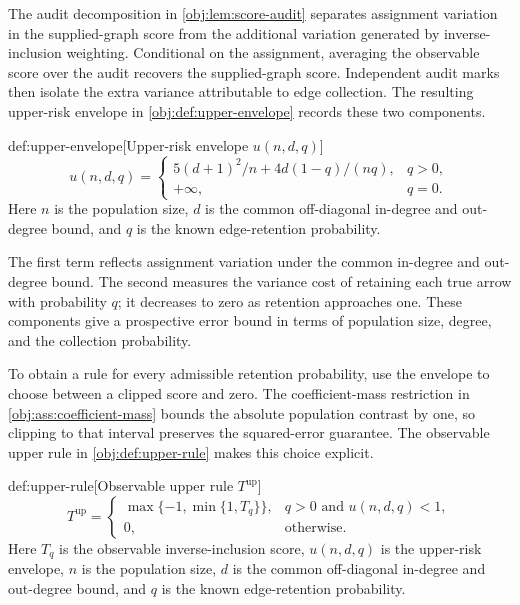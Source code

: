 The audit decomposition in \cref{obj:lem:score-audit} separates assignment variation in the supplied-graph score from the additional variation generated by inverse-inclusion weighting. Conditional on the assignment, averaging the observable score over the audit recovers the supplied-graph score. Independent audit marks then isolate the extra variance attributable to edge collection. The resulting upper-risk envelope  in \cref{obj:def:upper-envelope} records these two components.

\begin{definitionv}{def:upper-envelope}[Upper-risk envelope $u(n,d,q)$]
\[
u(n,d,q)
=
\begin{cases}
5(d+1)^2/n+4d(1-q)/(nq),&q>0,\\
+\infty,&q=0.
\end{cases}
\]
Here \(n\) is the population size, \(d\) is the common off-diagonal in-degree and out-degree bound, and \(q\) is the known edge-retention probability.
\end{definitionv}

The first term reflects assignment variation under the common in-degree and out-degree bound. The second measures the variance cost of retaining each true arrow with probability \(q\); it decreases to zero as retention approaches one. These components give a prospective error bound in terms of population size, degree, and the collection probability.

To obtain a rule for every admissible retention probability, use the envelope to choose between a clipped score and zero. The coefficient-mass restriction in \cref{obj:ass:coefficient-mass} bounds the absolute population contrast by one, so clipping to that interval preserves the squared-error guarantee. The observable upper rule  in \cref{obj:def:upper-rule} makes this choice explicit.

\begin{definitionv}{def:upper-rule}[Observable upper rule $T^{\mathrm{up}}$]
\[
T^{\mathrm{up}}
=
\begin{cases}
\max\{-1,\min\{1,T_q\}\},&q>0\text{ and }u(n,d,q)<1,\\
0,&\text{otherwise}.
\end{cases}
\]
Here \(T_q\) is the observable inverse-inclusion score, \(u(n,d,q)\) is the upper-risk envelope, \(n\) is the population size, \(d\) is the common off-diagonal in-degree and out-degree bound, and \(q\) is the known edge-retention probability.
\end{definitionv}

